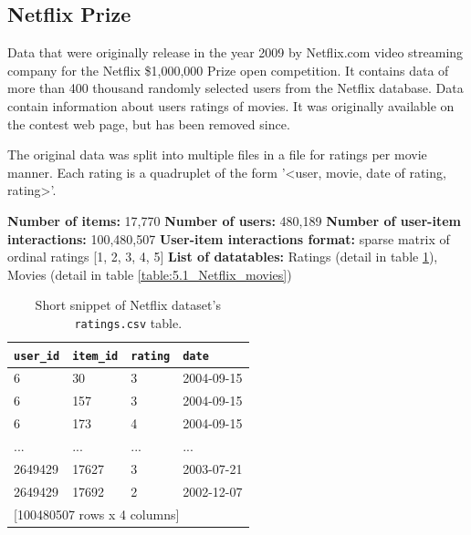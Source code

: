 

\subsection{Netflix Prize}

Data that were originally release in the year 2009 by Netflix.com video streaming company for the Netflix \$1,000,000 Prize open competition. It contains data of more than 400 thousand randomly selected users from the Netflix database. Data contain information about users ratings of movies. It was originally available on the contest web page, but has been removed since.

The original data was split into multiple files in a file for ratings per movie manner. Each rating is a quadruplet of the form '<user, movie, date of rating, rating>'.

\hfill \break
\noindent
\textbf{Number of items:} 17,770 \newline
\textbf{Number of users:} 480,189 \newline
\textbf{Number of user-item interactions:} 100,480,507 \newline
\textbf{User-item interactions format:} sparse matrix of ordinal ratings [1, 2, 3, 4, 5] \newline
\textbf{List of datatables:} Ratings (detail in table \ref{table:5.1_Netflix_ratings}), Movies (detail in table \ref{table:5.1_Netflix_movies})

\begin{table}[!ht]
    \centering
    \begin{tabular}{ l l l l }
        \verb|user_id| & \verb|item_id| & \verb|rating| & \verb|date| \\
        \hline
              6 &             30 &             3 &  2004-09-15 \\
              6 &            157 &             3 &  2004-09-15 \\
              6 &            173 &             4 &  2004-09-15 \\
            ... &            ... &           ... &         ... \\
        2649429 &          17627 &             3 &  2003-07-21 \\
        2649429 &          17692 &             2 &  2002-12-07 \\ [1mm]
        \multicolumn{4}{l}{{[100480507 rows x 4 columns]}}
    \end{tabular}
    \caption{Short snippet of Netflix dataset's \texttt{ratings.csv} table.}
    \label{table:5.1_Netflix_ratings}
\end{table}
    
